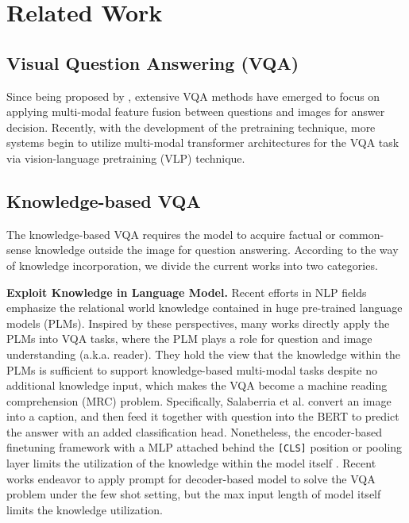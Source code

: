 \documentclass[sigconf]{acmart}
\newcommand{\cjy}[1]{{\color{black}#1}}
\begin{document}
\section{Related Work}
\subsection{Visual Question Answering (VQA)}
Since being proposed by \citep{antol2015vqa}, extensive VQA methods \citep{DBLP:conf/cvpr/00010BT0GZ18,DBLP:conf/nips/KimJZ18,DBLP:conf/cvpr/TeneyAHH18,DBLP:conf/semweb/0007CGPYC21} have emerged
to focus on applying multi-modal feature fusion between questions and images for answer decision. Recently, with the development of the pretraining technique, more  systems \citep{DBLP:conf/nips/LuBPL19,DBLP:conf/emnlp/TanB19,DBLP:conf/aaai/0010TYSTW021,DBLP:conf/eccv/Li0LZHZWH0WCG20,DBLP:conf/cvpr/ZhangLHY0WCG21,DBLP:conf/acl/LiGNXLL0020} begin to utilize multi-modal transformer architectures for the VQA task via vision-language pretraining (VLP) technique. 
\subsection{Knowledge-based VQA}
The knowledge-based VQA \citep{DBLP:journals/pami/WangWSDH18,DBLP:conf/cvpr/MarinoRFM19,DBLP:conf/aaai/ShahMYT19} requires the model to acquire factual or common-sense knowledge outside the image for question answering. According to the way of knowledge incorporation, we divide the current works into two categories.


\noindent\textbf{Exploit Knowledge in Language Model.}
Recent efforts in NLP fields \citep{DBLP:conf/emnlp/PetroniRRLBWM19,DBLP:conf/akbc/PetroniLPRWM020,DBLP:conf/emnlp/RobertsRS20,DBLP:conf/aaai/BianH0021,DBLP:conf/icml/WangYMLBLMZZY22} emphasize the relational world knowledge contained in huge pre-trained  language models (PLMs). 
Inspired by these perspectives, 
many works \citep{DBLP:journals/corr/abs-2109-08029,DBLP:journals/corr/abs-2106-13884,DBLP:journals/corr/abs-2109-05014} directly apply the PLMs into VQA tasks, where the PLM plays a role for question and image understanding (a.k.a. reader).
They hold the view that the knowledge within the PLMs is sufficient to support knowledge-based multi-modal tasks despite no additional knowledge input, which makes the VQA become a machine reading comprehension (MRC) problem. 
Specifically, Salaberria et al. \citep{DBLP:journals/corr/abs-2109-08029} convert an image into a caption\cjy{, and} then feed it together with question into the 
\cjy{BERT} \citep{DBLP:conf/naacl/DevlinCLT19} to predict the answer with an added classification head.
Nonetheless, the encoder-based finetuning framework with a MLP attached behind the {\tt [CLS]} position or pooling layer limits the utilization of the knowledge within the model itself \citep{DBLP:conf/acl/GaoFC20}.
Recent works \citep{DBLP:journals/corr/abs-2106-13884, DBLP:journals/corr/abs-2109-05014} endeavor to apply prompt for decoder-based model to solve the VQA problem under the few shot setting, but the max input length of model itself limits the knowledge utilization.
\end{document}
